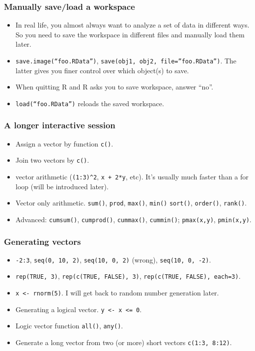 \begin{frame}
  \frametitle{Manually save/load a workspace}
  \begin{itemize}
  \item In real life, you almost always want to analyze a set of data
    in different ways.  So you need to save the workspace in different
    files and manually load them later.
  \item \texttt{save.image(``foo.RData'')}, \texttt{save(obj1, obj2,
      file=''foo.RData'')}.  The latter gives you finer control over
    which object(s) to save.
  \item When quitting R and R asks you to save workspace, answer
    ``no''.
  \item \texttt{load(``foo.RData'')} reloads the saved workspace.
  \end{itemize}
\end{frame}

\begin{frame}
  \frametitle{A longer interactive session}
  \begin{itemize}
  \item Assign a vector by function \texttt{c()}.
  \item Join two vectors by \texttt{c()}.
  \item vector arithmetic (\texttt{(1:3)\^{}2}, \texttt{x + 2*y},
    etc). It's usually much faster than a for loop (will be introduced
    later).
  \item Vector only arithmetic.  \texttt{sum()}, \texttt{prod},
    \texttt{max()}, \texttt{min()} \texttt{sort()}, \texttt{order()},
    \texttt{rank()}.
  \item Advanced: \texttt{cumsum()}, \texttt{cumprod()},
    \texttt{cummax()}, \texttt{cummin()}; \texttt{pmax(x,y)}, \texttt{pmin(x,y)}.
  \end{itemize}
\end{frame}

\begin{frame}
  \frametitle{Generating vectors}
  \begin{itemize}
  \item \texttt{-2:3}, \texttt{seq(0, 10, 2)}, \texttt{seq(10, 0, 2)}
    (wrong), \texttt{seq(10, 0, -2)}.
  \item \texttt{rep(TRUE, 3)}, \texttt{rep(c(TRUE, FALSE), 3)},
    \texttt{rep(c(TRUE, FALSE), each=3)}.
  \item \texttt{x <- rnorm(5)}.  I will get back to random number
    generation later.
  \item Generating a logical vector. \texttt{y <- x <= 0}.
  \item Logic vector function \texttt{all()}, \texttt{any()}.
  \item Generate a long vector from two (or more) short vectors
    \texttt{c(1:3, 8:12)}.
  \end{itemize}
\end{frame}

